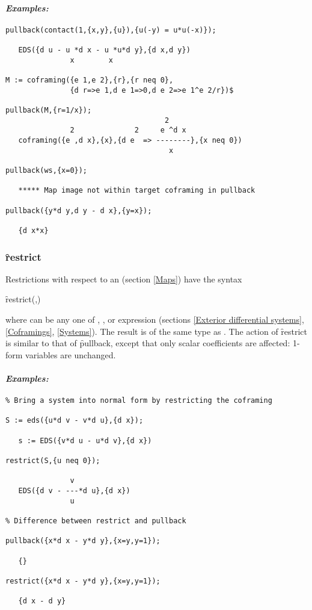 \paragraph{\textit{Examples:}}
\begin{verbatim}
pullback(contact(1,{x,y},{u}),{u(-y) = u*u(-x)});

   EDS({d u - u *d x - u *u*d y},{d x,d y})
               x        x

M := coframing({e 1,e 2},{r},{r neq 0},
               {d r=>e 1,d e 1=>0,d e 2=>e 1^e 2/r})$

pullback(M,{r=1/x});
                                     2
               2              2     e ^d x
   coframing({e ,d x},{x},{d e  => --------},{x neq 0})
                                      x

pullback(ws,{x=0});

   ***** Map image not within target coframing in pullback

pullback({y*d y,d y - d x},{y=x});

   {d x*x}
\end{verbatim}

\subsubsection{\f{restrict}}
\label{restrict}

\hypertarget{operator:RESTRICT}{}
Restrictions with respect to an   (section \ref{Maps}) have the
syntax
\begin{syntax}
	\f{restrict}(,)
\end{syntax}
where  can be any one of , ,
 or  expression (sections \ref{Exterior
differential systems}, \ref{Coframings}, \ref{Systems}). The result is of
the same type as . The action of \f{restrict} is similar to that
of \f{pullback}, except that only scalar coefficients are affected: 1-form
variables are unchanged.

\paragraph{\textit{Examples:}}
\begin{verbatim}
% Bring a system into normal form by restricting the coframing

S := eds({u*d v - v*d u},{d x});

   s := EDS({v*d u - u*d v},{d x})

restrict(S,{u neq 0});

               v
   EDS({d v - ---*d u},{d x})
               u

% Difference between restrict and pullback

pullback({x*d x - y*d y},{x=y,y=1});

   {}

restrict({x*d x - y*d y},{x=y,y=1});

   {d x - d y}
\end{verbatim}


